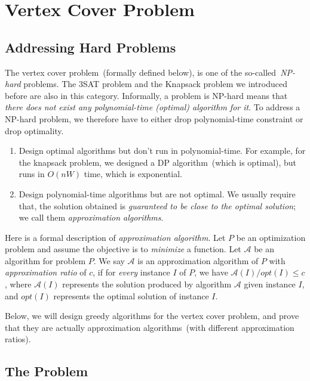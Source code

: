 \documentclass[letterpaper,11pt]{article}
\theoremstyle{mytheorem}
\begin{document}
\section*{Vertex Cover Problem}

\subsection*{Addressing Hard Problems}

The vertex cover problem~(formally defined below), is one of the
so-called~\emph{NP-hard} problems.  The 3SAT problem and the Knapsack problem
we introduced before are also in this category.  Informally, a problem is
{NP-hard} means that \emph{there does not exist any polynomial-time (optimal)
algorithm for it}. To address a NP-hard problem, we therefore have to either
drop polynomial-time constraint or drop optimality.

\vspace*{-\topsep}
\begin{enumerate}
\item Design optimal algorithms but don't run in polynomial-time.
For example, for the knapsack problem, we designed a DP algorithm~(which
is optimal), but runs in $O(nW)$ time, which is exponential.
\item Design polynomial-time algorithms but are not optimal.
We usually require that, the solution obtained is \emph{guaranteed
to be close to the optimal solution}; we call them \emph{approximation algorithms}.
\end{enumerate}

Here is a formal description of \emph{approximation algorithm}.
Let $P$ be an optimization problem and assume the objective
is to \emph{minimize} a function.
Let $\mathcal{A}$ be an algorithm for problem $P$. We say $\mathcal{A}$
is an approximation algorithm of $P$ with \emph{approximation ratio} of $c$, if for \emph{every} instance
$I$ of $P$, we have $\mathcal{A}(I) / opt(I) \le c$,
where $\mathcal{A}(I)$ represents the solution produced by algorithm $\mathcal{A}$ given instance $I$,
and $opt(I)$ represents the optimal solution of instance $I$.

Below, we will design greedy algorithms for the vertex cover problem, and
prove that they are actually approximation algorithms~(with different approximation ratios).

\subsection*{The Problem}
\end{document}
